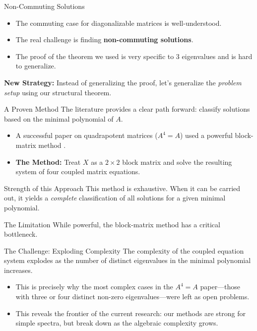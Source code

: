 \documentclass{beamer}
\begin{document}
\begin{frame}{Non-Commuting Solutions}
  \begin{itemize}
    \item The commuting case for diagonalizable matrices is well-understood. \cite{diagonalizable}
    \item The real challenge is finding \textbf{non-commuting solutions}.
    \item The proof of the theorem we used is very specific to 3 eigenvalues and is hard to generalize.
  \end{itemize}
  \vfill
  \textbf{New Strategy:} Instead of generalizing the proof, let's generalize the \textit{problem setup} using our structural theorem.
\end{frame}

\begin{frame}{A Proven Method}
  The literature provides a clear path forward: classify solutions based on the minimal polynomial of $A$.
  \begin{itemize}
    \item A successful paper on quadrapotent matrices ($A^4=A$) used a powerful block-matrix method \cite{quadrapotent}.
    \item \textbf{The Method:} Treat $X$ as a $2 \times 2$ block matrix and solve the resulting system of four coupled matrix equations.
  \end{itemize}
  \begin{block}{Strength of this Approach}
    This method is exhaustive. When it can be carried out, it yields a \textit{complete} classification of all solutions for a given minimal polynomial.
  \end{block}
\end{frame}

\begin{frame}{The Limitation}
  While powerful, the block-matrix method has a critical bottleneck.
  \begin{alertblock}{The Challenge: Exploding Complexity}
  The complexity of the coupled equation system explodes as the number of distinct eigenvalues in the minimal polynomial increases.
  \end{alertblock}
  \begin{itemize}
    \item This is precisely why the most complex cases in the $A^4=A$ paper—those with three or four distinct non-zero eigenvalues—were left as open problems.
    \item This reveals the frontier of the current research: our methods are strong for simple spectra, but break down as the algebraic complexity grows.
  \end{itemize}
\end{frame}
\end{document}
